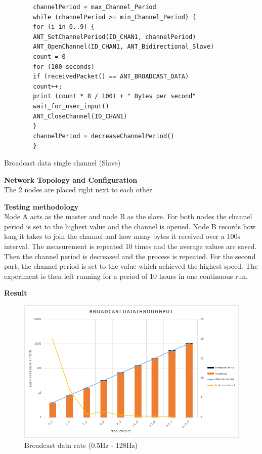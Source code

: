\begin{description}
	\begin{code}[h]
		\begin{verbatim}
		channelPeriod = max_Channel_Period
		while (channelPeriod >= min_Channel_Period) {
		for (i in 0..9) {
		ANT_SetChannelPeriod(ID_CHAN1, channelPeriod)
		ANT_OpenChannel(ID_CHAN1, ANT_Bidirectional_Slave)
		count = 0
		for (100 seconds) 
		if (receivedPacket() == ANT_BROADCAST_DATA)
		count++;			  
		print (count * 8 / 100) + " Bytes per second"
		wait_for_user_input()
		ANT_CloseChannel(ID_CHAN1)
		}
		channelPeriod = decreaseChannelPeriod()
		}
		\end{verbatim}
		\caption{Broadcast data single channel (Slave)}\label{lst:sExp1}
	\end{code}	
	\item{\textbf{Network Topology and Configuration}} \hfill \\ The 2 nodes are placed right next to each other.
	\item{\textbf{Testing methodology}} \hfill \\Node A acts as the master and node B as the slave. For both nodes the channel period is set to the highest value and the channel is opened. Node B records how long it takes to join the channel and how many bytes it received over a 100s interval. The measurement is repeated 10 times and the average values are saved. Then the channel period is decreased and the process is repeated. For the second part, the channel period is set to the value which achieved the highest speed. The experiment is then left running for a period of 10 hours in one continuous run.
	\item{\textbf{Result}} \hfill \\  
	\begin{figure}[h]
		\centering
		\includegraphics[scale=0.5]{content/images/exp1_norm.png}
		\caption{Broadcast data rate (0.5Hz - 128Hz)}\label{fig:exp1norm}
	\end{figure}
	

\end{description}
